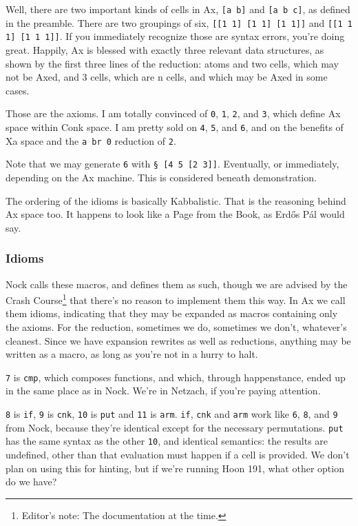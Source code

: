 \documentclass[twoside]{article}
\begin{document}
Well, there are two important kinds of cells in Ax, \texttt{[a b]} and \texttt{[a b c]}, as defined in the preamble. There are two groupings of six, \texttt{[[1 1] [1 1] [1 1]]} and \texttt{[[1 1 1] [1 1 1]]}. If you immediately recognize those are syntax errors, you're doing great. Happily, Ax is blessed with exactly three relevant data structures, as shown by the first three lines of the reduction: atoms and two cells, which may not be Axed, and 3 cells, which are n cells, and which may be Axed in some cases. 

Those are the axioms. I am totally convinced of \texttt{0}, \texttt{1}, \texttt{2}, and \texttt{3}, which define Ax space within Conk space. I am pretty sold on \texttt{4}, \texttt{5}, and \texttt{6}, and on the benefits of Xa space and the \texttt{a br 0} reduction of \texttt{2}.

Note that we may generate \texttt{6} with \texttt{§ [4 5 [2 3]]}. Eventually, or immediately, depending on the Ax machine. This is considered beneath demonstration.

The ordering of the idioms is basically Kabbalistic. That is the reasoning behind Ax space too. It happens to look like a Page from the Book, as Erdős Pál would say.

\subsubsection{Idioms}

Nock calls these macros, and defines them as such, though we are advised by the Crash Course\footnote{Editor's note:  The documentation at the time.} that there's no reason to implement them this way. In Ax we call them idioms, indicating that they may be expanded as macros containing only the axioms. For the reduction, sometimes we do, sometimes we don't, whatever's cleanest. Since we have expansion rewrites as well as reductions, anything may be written as a macro, as long as you're not in a hurry to halt. 

\texttt{7} is \texttt{cmp}, which composes functions, and which, through happenstance, ended up in the same place as in Nock. We're in Netzach, if you're paying attention.

\texttt{8} is \texttt{if}, \texttt{9} is \texttt{cnk}, \texttt{10} is \texttt{put} and \texttt{11} is \texttt{arm}. \texttt{if}, \texttt{cnk} and \texttt{arm} work like \texttt{6}, \texttt{8}, and \texttt{9} from Nock, because they're identical except for the necessary permutations. \texttt{put} has the same syntax as the other \texttt{10}, and identical semantics: the results are undefined, other than that evaluation must happen if a cell is provided. We don't plan on using this for hinting, but if we're running Hoon 191, what other option do we have? 
\end{document}
